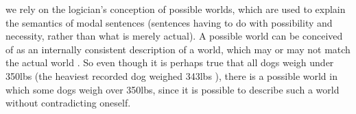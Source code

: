 \documentclass[twocolumn,10pt]{asme2ej}
\begin{document}
%
%
%
we rely on the logician's conception of possible worlds, which are used to explain the semantics of modal sentences (sentences having to do with possibility and necessity, rather than what is merely actual). 
%
A possible world can be conceived of as an internally consistent description of a world, which may or may not match the actual world \cite{Adams1974,Lewis1986}. 
%
So even though it is perhaps true that all dogs weigh under 350lbs (the heaviest recorded dog weighed 343lbs \cite{Young1994}), there is a possible world in which some dogs weigh over 350lbs, since it is possible to describe such a world without contradicting oneself.
\end{document}
